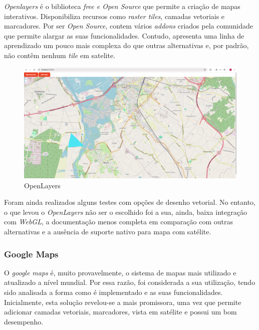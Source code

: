 \textit{Openlayers} é o biblioteca \textit{free e Open Source} que permite a criação de mapas interativos. Disponibiliza recursos como \textit{raster tiles}, camadas vetoriais e marcadores. Por ser \textit{Open Source}, contem vários \textit{addons} criados pela comunidade que permite alargar as suas funcionalidades. Contudo, apresenta uma linha de aprendizado um pouco mais complexa do que outras alternativas e, por padrão, não contêm  nenhum \textit{tile} em satelite. 

\begin{figure}[h!]
    \centering
    \includegraphics[width=\textwidth-1cm]{figs/ol.png}
    \caption[OpenLayers]{OpenLayers}
    \label{fig:ol}
\end{figure}

Foram ainda realizados alguns testes com opções de desenho vetorial. No entanto, o que levou o \textit{OpenLayers} não ser o escolhido foi a sua, ainda, baixa integração com \textit{WebGL}, a documentação menos completa em comparação com outras alternativas e a ausência de suporte nativo para mapa com satélite. 

\vspace{0.5cm}

\subsubsection{\textbf{Google Maps}}\label{sec:sub_gm}
O \textit{google maps} é, muito provavelmente, o sistema de mapas mais utilizado e atualizado a nível mundial. Por essa razão, foi considerada a sua utilização, tendo sido analisada a forma como é implementado e as suas funcionalidades. Inicialmente, esta solução revelou-se a mais promissora, uma vez que permite adicionar camadas vetoriais, marcadores, vista em satélite e possui um bom desempenho. 

